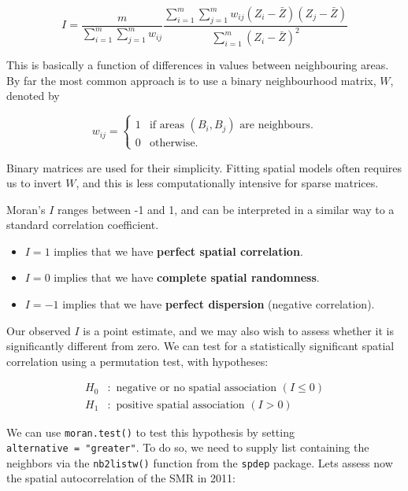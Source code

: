 \documentclass[
  letterpaper,
  DIV=11,
  numbers=noendperiod]{scrartcl}
\begin{document}
\[
I = \frac{m}{\sum_{i=1}^m \sum_{j=1}^m w_{ij}}\frac{\sum_{i=1}^m \sum_{j=1}^m w_{ij} (Z_i - \bar{Z})(Z_j - \bar{Z})}{\sum_{i=1}^m (Z_i - \bar{Z})^2}
\]

This is basically a function of differences in values between
neighbouring areas. By far the most common approach is to use a binary
neighbourhood matrix, \(W\), denoted by

\[ w_{ij} = \begin{cases} 1 & \text{if areas } (B_i, B_j) \text{ are neighbours.}\\ 0 & \text{otherwise.} \end{cases} \]

Binary matrices are used for their simplicity. Fitting spatial models
often requires us to invert \(W\), and this is less computationally
intensive for sparse matrices.

Moran's \(I\) ranges between -1 and 1, and can be interpreted in a
similar way to a standard correlation coefficient.

\begin{itemize}
\item
  \(I=1\) implies that we have \textbf{perfect spatial correlation}.
\item
  \(I=0\) implies that we have \textbf{complete spatial randomness}.
\item
  \(I=-1\) implies that we have \textbf{perfect dispersion} (negative
  correlation).
\end{itemize}

Our observed \(I\) is a point estimate, and we may also wish to assess
whether it is significantly different from zero. We can test for a
statistically significant spatial correlation using a permutation test,
with hypotheses:

\[
\begin{aligned}
H_0&: \text{ negative or no spatial association } (I \leq 0)\\
H_1&: \text{ positive spatial association } (I > 0)
\end{aligned}
\]

We can use \texttt{moran.test()} to test this hypothesis by setting
\texttt{alternative\ =\ "greater"}. To do so, we need to supply list
containing the neighbors via the \texttt{nb2listw()} function from the
\texttt{spdep} package. Lets assess now the spatial autocorrelation of
the SMR in 2011:
\end{document}
